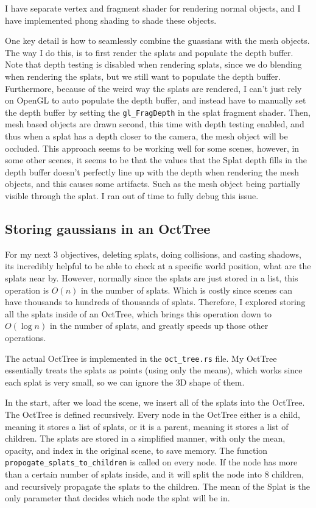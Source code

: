 \documentclass {article}
\begin{document}
I have separate vertex and fragment shader for rendering normal objects, and I have implemented phong shading to shade these objects.

One key detail is how to seamlessly combine the guassians with the mesh objects. The way I do this, is to first render the splats and populate the depth buffer. Note that depth testing is disabled when rendering splats, since we do blending when rendering the splats, but we still want to populate the depth buffer. Furthermore, because of the weird way the splats are rendered, I can't just rely on OpenGL to auto populate the depth buffer, and instead have to manually set the depth buffer by setting the \lstinline[style=inlinecode]{gl_FragDepth} in the splat fragment shader. Then, mesh based objects are drawn second, this time with depth testing enabled, and thus when a splat has a depth closer to the camera, the mesh object will be occluded. This approach seems to be working well for some scenes, however, in some other scenes, it seems to be that the values that the Splat depth fills in the depth buffer doesn't perfectly line up with the depth when rendering the mesh objects, and this causes some artifacts. Such as the mesh object being partially visible through the splat. I ran out of time to fully debug this issue.




\subsection{Storing gaussians in an OctTree}
For my next 3 objectives, deleting splats, doing collisions, and casting shadows, its incredibly helpful to be able to check at a specific world position, what are the splats near by. However, normally since the splats are just stored in a list, this operation is $O(n)$ in the number of splats. Which is costly since scenes can have thousands to hundreds of thousands of splats. Therefore, I explored storing all the splats inside of an OctTree, which brings this operation down to $O(\log n)$ in the number of splats, and greatly speeds up those other operations.



The actual OctTree is implemented in the \lstinline[style=inlinecode]{oct_tree.rs} file. My OctTree essentially treats the splats as points (using only the means), which works since each splat is very small, so we can ignore the 3D shape of them.

In the start, after we load the scene, we insert all of the splats into the OctTree. The OctTree is defined recursively. Every node in the OctTree either is a child, meaning it stores a list of splats, or it is a parent, meaning it stores a list of children. The splats are stored in a simplified manner, with only the mean, opacity, and index in the original scene, to save memory. The function \lstinline[style=inlinecode]{propogate_splats_to_children} is called on every node. If the node has more than a certain number of splats inside, and it will split the node into 8 children, and recursively propagate the splats to the children. The mean of the Splat is the only parameter that decides which node the splat will be in.
\end{document}
